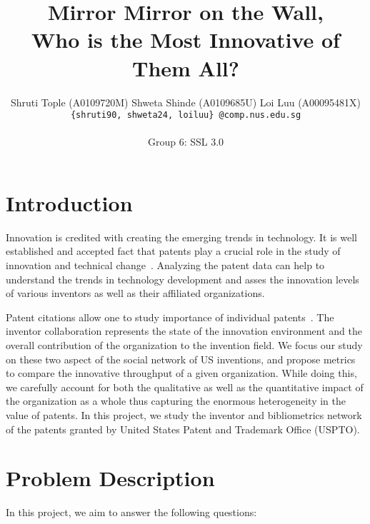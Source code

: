 \documentclass[11pt]{article}
\begin{document}
\title{
\vspace{-6ex}
Mirror Mirror on the Wall, \\
 Who is the Most Innovative of Them All? }
\author{Shruti Tople {\footnotesize (A0109720M)} \qquad Shweta Shinde {\footnotesize(A0109685U)} \qquad Loi Luu {\footnotesize(A00095481X)}\\ \texttt{\{shruti90, shweta24, loiluu\}~@comp.nus.edu.sg} \\ \\
Group 6: SSL 3.0
}
\date{}

\maketitle
\pagestyle{empty}
\thispagestyle{empty}

\section{Introduction}

Innovation is credited with creating the emerging trends in technology.
It is well established and accepted fact that patents play a crucial role in the study of innovation and technical change~\cite{narin1987patents}. Analyzing the patent data can help to understand the trends in technology development and asses the innovation levels of various inventors as well as their affiliated organizations. 

Patent citations allow one to study importance of individual patents~\cite{albert1991direct}. The inventor collaboration represents the state of the innovation environment and the overall contribution of the organization to the invention field. We focus our study on these two aspect of the social network of US inventions, and propose metrics to compare the innovative throughput of a given organization. While doing this, we carefully account for both the qualitative as well as the quantitative impact of the organization as a whole thus capturing the enormous heterogeneity in the value of patents. In this project, we study the inventor and bibliometrics network of the patents granted by United States Patent and Trademark Office (USPTO).


\section{Problem Description} 
In this project, we aim to answer the following questions:
\end{document}
